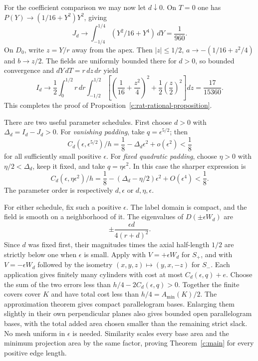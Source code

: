 For the coefficient comparison we may now let $d\downarrow0$.
On $T=0$ one has
$P(Y)\to(1/16+Y^2)Y^2$, giving
\[
 J_d\longrightarrow\int_{-1/4}^{1/4}(Y^2/16+Y^4)\,dY
                 =\frac1{960}.
\]
On $D_0$, write $z=Y/r$ away from the apex.  Then $|z|\le1/2$,
$a\to-(1/16+z^2/4)$ and $b\to z/2$.  The fields are uniformly
bounded there for $d>0$, so bounded convergence and $dY\,dT=r\,dz\,dr$
yield
\[
 I_d\longrightarrow\frac12\int_0^{1/2}r\,dr
     \int_{-1/2}^{1/2}
      \left[\left(\frac1{16}+\frac{z^2}4\right)^2
                     +\frac12\left(\frac z2\right)^2\right]dz
     =\frac{17}{15360}.
\]
This completes the proof of Proposition~\ref{c:rat-rational-proposition}.

There are two useful parameter schedules.  First choose $d>0$ with
$\Delta_d=I_d-J_d>0$.
For \emph{vanishing padding}, take $q=\epsilon^{5/2}$; then
\[
 C_d(\epsilon,\epsilon^{5/2})/h
       =\frac18-\Delta_d\epsilon^2+o(\epsilon^2)<\frac18
\]
for all sufficiently small positive $\epsilon$.
For \emph{fixed quadratic padding}, choose $\eta>0$ with
$\eta/2<\Delta_d$, keep it fixed, and take $q=\eta\epsilon^2$.
In this case the sharper expression is
\[
 C_d(\epsilon,\eta\epsilon^2)/h
       =\frac18-(\Delta_d-\eta/2)\epsilon^2+O(\epsilon^4)<\frac18.
\]
The parameter order is respectively $d,\epsilon$ or $d,\eta,\epsilon$.

For either schedule, fix such a positive $\epsilon$.
The label domain is compact, and the field is smooth on a neighborhood
of it.  The eigenvalues of $D(\pm\epsilon W_d)$ are
\[
 \pm\frac{\epsilon d}{4(r+d)^2}.
\]
Since $d$ was fixed first, their magnitudes times the axial half-length
$1/2$ are strictly below one when $\epsilon$ is small.
Apply \BScaling{} with $V=+\epsilon W_d$
for $S_+$, and with $V=-\epsilon W_d$ followed by the isometry
$(x,y,z)\mapsto(y,x,-z)$ for $S_-$.  Each application gives finitely
many cylinders with cost at most $C_d(\epsilon,q)+e$.  Choose the sum of the two errors less than
$h/4-2C_d(\epsilon,q)>0$.  Together the finite covers cover $K$ and
have total cost less than $h/4=A_{\min}(K)/2$.
The approximation theorem gives compact parallelogram bases.  Enlarging
them slightly in their own perpendicular planes also gives bounded
open parallelogram bases, with the total added area chosen smaller
than the remaining strict slack.  No mesh uniform in $\epsilon$ is
needed.  Similarity scales every base area and the minimum projection
area by the same factor, proving Theorem~\ref{c:main}
for every positive edge length.
